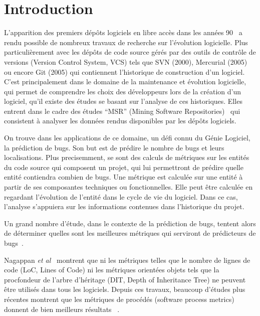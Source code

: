 \section{Introduction}
\label{sec:intro}

L'apparition des premiers dépôts logiciels en libre accès dans les années 90~\cite{list_vcs} a rendu possible de nombreux travaux de recherche sur l'évolution logicielle. Plus particulièrement avec les dépôts de code source gérés par des outils de contrôle de versions (Version Control System, VCS) tels que  SVN (2000), Mercurial (2005) ou encore Git (2005) qui contiennent l'historique de construction d'un logiciel.\\  

C'est principalement dans le domaine de la maintenance et évolution logicielle, qui permet de comprendre les choix des développeurs lors de la création d'un logiciel, qu'il existe des études se basant sur l'analyse de ces historiques. Elles entrent dans le cadre des études ``MSR'' (Mining Software Repositories)~\cite{herzig-makingsoftware-2010} qui consistent à analyser les données rendus disponibles par les dépôts logiciels.

On trouve dans les applications de ce domaine, un défi connu du Génie Logiciel, la prédiction de bugs. Son but est de prédire le nombre de bugs et leurs localisations. Plus precisemment, se sont des calculs de métriques sur les entités du code source qui composent un projet, qui lui permettront de prédire quelle entité contiendra combien de bugs. Une métrique est calculée sur une entité à partir de ses composantes techniques ou fonctionnelles. Elle peut être calculée en regardant l'évolution de l'entité dans le cycle de vie du logiciel. Dans ce cas, l'analyse s'appuiera sur les informations contenues dans l'historique du projet.

Un grand nombre d'étude, dans le contexte de la prédiction de bugs, tentent alors de déterminer quelles sont les meilleures métriques qui serviront de prédicteurs de bugs~\cite{fenton_critique_1999}.

Nagappan \emph{et al}~\cite{nagappan_mining_2006} montrent que ni les métriques telles que le nombre de lignes de code (LoC, Lines of Code) ni les métriques orientées objets tels que la procfondeur de l'arbre d'héritage (DIT, Depth of Inheritance Tree) ne peuvent être utilisés dans tous les logiciels. Depuis ces travaux, beaucoup d'études plus récentes montrent que les métriques de procédés (software process metrics) donnent de bien meilleurs résultats ~\cite{nagappan_use_2005,weyuker_too_2008,bird_dont_2011,giger_can_2012}.\\

